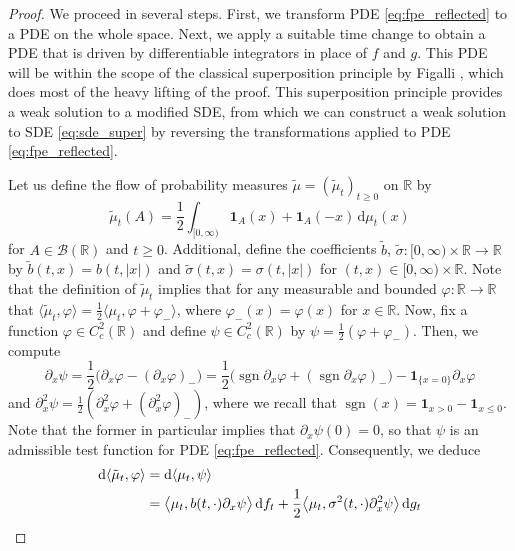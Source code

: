 \documentclass[11pt, a4paper]{article}
\theoremstyle{plain}
\theoremstyle{definition}
\theoremstyle{remark}
\numberwithin{equation}{section}
\DeclareMathOperator{\sgn}{sgn}
\newcommand{\R}{\mathbb{R}}
\renewcommand{\d}{\mathrm{d}}
\newcommand{\define}{\mathpunct{:}}
\renewcommand{\bf}[1]{\mathbf{#1}}
\renewcommand{\cal}[1]{\mathcal{#1}}
\begin{document}
\begin{proof}
We proceed in several steps. First, we transform PDE \eqref{eq:fpe_reflected} to a PDE on the whole space. Next, we apply a suitable time change to obtain a PDE that is driven by differentiable integrators in place of $f$ and $g$. This PDE will be within the scope of the classical superposition principle by Figalli \cite[Theorem 2.6]{figalli_superposition_2008}, which does most of the heavy lifting of the proof. This superposition principle provides a weak solution to a modified SDE, from which we can construct a weak solution to SDE \eqref{eq:sde_super} by reversing the transformations applied to PDE \eqref{eq:fpe_reflected}.

Let us define the flow of probability measures $\tilde{\mu} = (\tilde{\mu}_t)_{t \geq 0}$ on $\R$ by
\begin{equation*}
    \tilde{\mu}_t(A) = \frac{1}{2} \int_{[0, \infty)} \bf{1}_A(x) + \bf{1}_A(-x) \, \d \mu_t(x)
\end{equation*}
for $A \in \cal{B}(\R)$ and $t \geq 0$. Additional, define the coefficients $\tilde{b}$, $\tilde{\sigma} \define [0, \infty) \times \R \to \R$ by $\tilde{b}(t, x) = b(t, \lvert x\rvert)$ and $\tilde{\sigma}(t, x) = \sigma(t, \lvert x\rvert)$ for $(t, x) \in [0, \infty) \times \R$. Note that the definition of $\tilde{\mu}_t$ implies that for any measurable and bounded $\varphi \define \R \to \R$ that $\langle \tilde{\mu}_t, \varphi\rangle = \frac{1}{2} \langle \mu_t, \varphi + \varphi_-\rangle$, where $\varphi_-(x) = \varphi(x)$ for $x \in \R$. Now, fix a function $\varphi \in C_c^2(\R)$ and define $\psi \in C_c^2(\R)$ by $\psi = \frac{1}{2} (\varphi + \varphi_-)$. Then, we compute
\begin{equation*}
    \partial_x \psi = \frac{1}{2}\bigl(\partial_x\varphi - (\partial_x \varphi)_-\bigr) = \frac{1}{2} \bigl(\sgn \partial_x \varphi + (\sgn \partial_x \varphi)_-\bigr) - \bf{1}_{\{x = 0\}} \partial_x \varphi
\end{equation*}
and $\partial_x^2 \psi = \frac{1}{2}(\partial_x^2 \varphi + (\partial_x^2 \varphi)_-)$, where we recall that $\sgn(x) = \bf{1}_{x > 0} - \bf{1}_{x \leq 0}$. Note that the former in particular implies that $\partial_x \psi(0) = 0$, so that $\psi$ is an admissible test function for PDE \eqref{eq:fpe_reflected}. Consequently, we deduce
\begin{align} \label{eq:fpe_whole}
    \d \langle \tilde{\mu}_t, \varphi\rangle &= \d \langle \mu_t, \psi\rangle \notag \\
    &= \bigl\langle \mu_t, b(t, \cdot) \partial_x \psi\bigr\rangle \, \d f_t + \frac{1}{2} \bigl\langle \mu_t, \sigma^2(t, \cdot) \partial_x^2 \psi\bigr\rangle \, \d g_t \notag \\

\end{align}
\end{proof}
\end{document}
